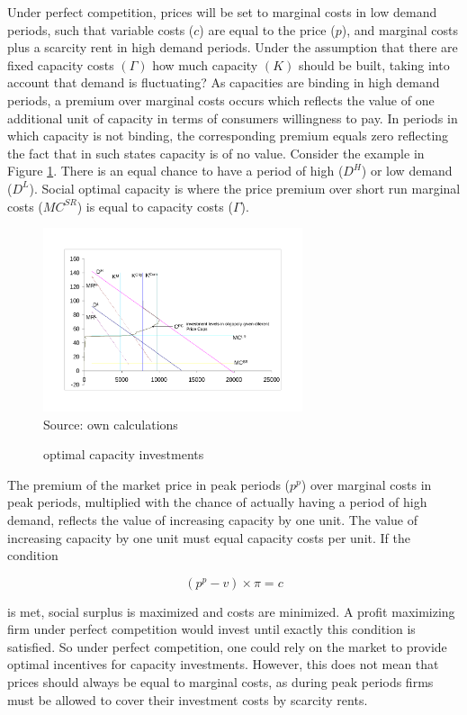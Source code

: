 Under perfect competition, prices will be set to marginal costs in low demand periods, such that variable costs ($c$) are equal to the price ($p$), and marginal costs plus a scarcity rent in high demand periods. Under the assumption that there are fixed capacity costs $(\Gamma)$ how much capacity $(K)$ should be built, taking into account that demand is fluctuating? As capacities are binding in high demand periods, a premium over marginal costs occurs which reflects the value of one additional unit of capacity in terms of consumers willingness to pay. In periods in which capacity is not binding, the corresponding premium equals zero reflecting the fact that in such states capacity is of no value. Consider the example in Figure \ref{eigenes_modell}. There is an equal chance to have a period of high ($D^H$) or low demand ($D^L$). Social optimal capacity is where the price premium over short run marginal costs ($MC^{SR}$) is equal to capacity costs ($\Gamma$).



\begin{figure}[h]
\centering
\caption{optimal capacity investments}
\includegraphics[width=3.0in]{capacity/eigenes_modell}
      \label{eigenes_modell}  
\\          
\scriptsize Source: own calculations
\end{figure}

The premium of the market price in peak periods ($p^p$) over marginal costs in peak periods, multiplied with the chance of actually having a period of high demand, reflects the value of increasing capacity by one unit.  The value of increasing capacity by one unit must equal capacity costs per unit. If the condition

$$(p^p-v)\times\pi=c$$

is met, social surplus is maximized and costs are minimized. A profit maximizing firm under perfect competition would invest until exactly this condition is satisfied. So under perfect competition, one could rely on the market to provide optimal incentives for capacity investments. However, this does not mean that prices should always be equal to marginal costs, as during peak periods firms must be allowed to cover their investment costs by scarcity rents.

